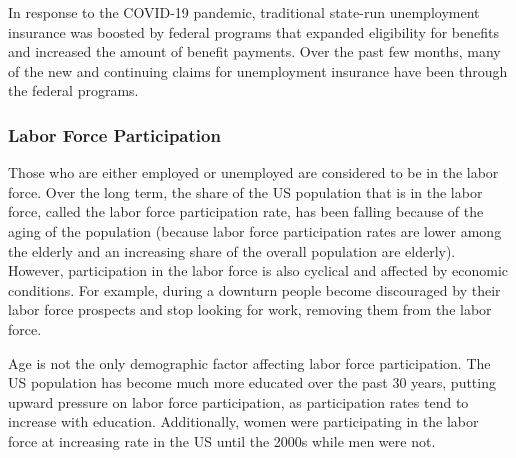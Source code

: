 \documentclass{report}
\begin{document}
{{\begin{minipage}{0.76\textwidth}
\small In response to the COVID-19 pandemic, traditional state-run unemployment insurance was boosted by federal programs that expanded eligibility for benefits and increased the amount of benefit payments. Over the past few months, many of the new and continuing claims for unemployment insurance have been through the federal programs. 



\end{minipage}
\newpage
\begin{minipage}{0.76\textwidth}
\subsubsection*{\color{black!70} \seriffont Labor Force Participation}
\small Those who are either employed or unemployed are considered to be in the labor force. Over the long term, the share of the US population that is in the labor force, called the labor force participation rate, has been falling because of the aging of the population (because labor force participation rates are lower among the elderly and an increasing share of the overall population are elderly). However, participation in the labor force is also cyclical and affected by economic conditions. For example, during a downturn people become discouraged by their labor force prospects and stop looking for work, removing them from the labor force.

Age is not the only demographic factor affecting labor force participation. The US population has become much more educated over the past 30 years, putting upward pressure on labor force participation, as participation rates tend to increase with education. Additionally, women were participating in the labor force at increasing rate in the US until the 2000s while men were not.




\vspace{1mm}


\end{minipage}}}
\end{document}
